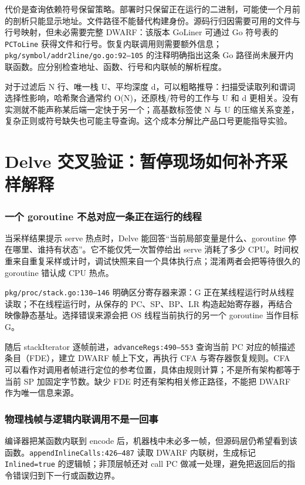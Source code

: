 \documentclass[UTF8,fontset=fandol,openany,11pt]{ctexbook}
\begin{document}
代价是查询依赖符号保留策略。部署时只保留正在运行的二进制，可能使一个月前的剖析只能显示地址。文件路径不能替代构建身份。源码行归因需要可用的文件与行号映射，但未必需要完整 DWARF：该版本 GoLiner 可通过 Go 符号表的 \texttt{PCToLine} 获得文件和行号。恢复内联调用则需要额外信息；\texttt{pkg/\allowbreak{}symbol/\allowbreak{}addr2line/\allowbreak{}go.\allowbreak{}go:\allowbreak{}92–105} 的注释明确指出这条 Go 路径尚未展开内联函数。应分别检查地址、函数、行号和内联帧的解析程度。

对于过滤后 N 行、唯一栈 U、平均深度 d，可以粗略推导：扫描受读取列和谓词选择性影响，哈希聚合通常约 O(N)，还原栈/符号的工作与 U 和 d 更相关。没有实测就不能声称某后端一定快于另一个；高基数标签使 N 与 U 的压缩关系变差，复杂正则或符号缺失也可能主导查询。这个成本分解比产品口号更能指导实验。

\section{Delve 交叉验证：暂停现场如何补齐采样解释}
\subsubsection{一个 goroutine 不总对应一条正在运行的线程}
当采样结果提示 serve 热点时，Delve 能回答“当前局部变量是什么、goroutine 停在哪里、谁持有状态”。它不能仅凭一次暂停给出 serve 消耗了多少 CPU。时间权重来自重复采样或计时，调试快照来自一个具体执行点；混淆两者会把等待很久的 goroutine 错认成 CPU 热点。

\texttt{pkg/\allowbreak{}proc/\allowbreak{}stack.\allowbreak{}go:\allowbreak{}130–146} 明确区分寄存器来源：G 正在某线程运行时从线程读取；不在线程运行时，从保存的 PC、SP、BP、LR 构造起始寄存器，再结合映像静态基址。选择错误来源会把 OS 线程当前执行的另一个 goroutine 当作目标 G。\cite{proj-delve-stack}

随后 stackIterator 逐帧前进，\texttt{advanceRegs:\allowbreak{}490–553} 查询当前 PC 对应的帧描述条目（FDE），建立 DWARF 帧上下文，再执行 CFA 与寄存器恢复规则。CFA 可以看作对调用者帧进行定位的参考位置，具体由规则计算；不是所有架构都等于当前 SP 加固定字节数。缺少 FDE 时还有架构相关修正路径，不能把 DWARF 作为唯一信息来源。

\subsubsection{物理栈帧与逻辑内联调用不是一回事}
编译器把某函数内联到 encode 后，机器栈中未必多一帧，但源码层仍希望看到该函数。\texttt{appendInli\allowbreak{}neCalls:\allowbreak{}426–487} 读取 DWARF 内联树，生成标记 \texttt{Inlined=true} 的逻辑帧；非顶层帧还对 call PC 做减一处理，避免把返回后的指令错误归到下一行或函数边界。
\end{document}
